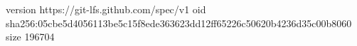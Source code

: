 version https://git-lfs.github.com/spec/v1
oid sha256:05cbe5d4056113be5c15f8ede363623dd12ff65226c50620b4236d35c00b8060
size 196704
